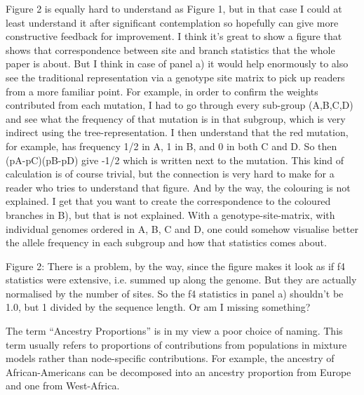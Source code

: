 \begin{point}{}
Figure 2 is equally hard to understand as Figure 1, but in that case I could at least understand it after significant contemplation so hopefully can give more constructive feedback for improvement. I think it's great to show a figure that shows that correspondence between site and branch statistics that the whole paper is about. But I think in case of panel a) it would help enormously to also see the traditional representation via a genotype site matrix to pick up readers from a more familiar point. For example, in order to confirm the weights contributed from each mutation, I had to go through every sub-group (A,B,C,D) and see what the frequency of that mutation is in that subgroup, which is very indirect using the tree-representation. I then understand that the red mutation, for example, has frequency 1/2 in A, 1 in B, and 0 in both C and D. So then (pA-pC)(pB-pD) give -1/2 which is written next to the mutation. This kind of calculation is of course trivial, but the connection is very hard to make for a reader who tries to understand that figure. And by the way, the colouring is not explained. I get that you want to create the correspondence to the coloured branches in B), but that is not explained. With a genotype-site-matrix, with individual genomes ordered in A, B, C and D, one could somehow visualise better the allele frequency in each subgroup and how that statistics comes about.
\end{point}


\begin{point}{Figure 2:}
There is a problem, by the way, since the figure makes it look as if f4 statistics were extensive, i.e. summed up along the genome. But they are actually normalised by the number of sites. So the f4 statistics in panel a) shouldn't be 1.0, but 1 divided by the sequence length. Or am I missing something?
\end{point}




\begin{point}{\revref}
        The term ``Ancestry Proportions'' is in my view a poor choice of naming. This term usually refers to proportions of contributions from populations in mixture models rather than node-specific contributions. For example, the ancestry of African-Americans can be decomposed into an ancestry proportion from Europe and one from West-Africa.
\end{point}

